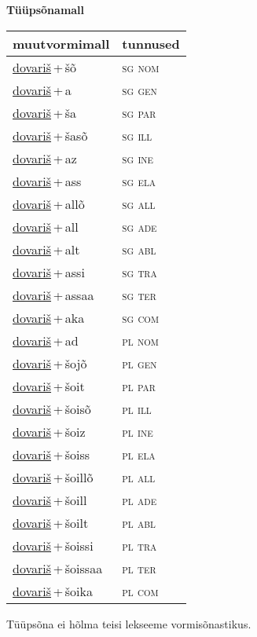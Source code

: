 
\vspace{1.8em}
\begin{minipage}{\textwidth}
\textbf{Tüüpsõnamall \,}\\

\begin{sideways}
\begin{tabular}{l l}
muutvormimall & tunnused \\
\hline
\underline{dovariš}\,+\,šõ & \textsc{ sg nom } \\
\underline{dovariš}\,+\,a & \textsc{ sg gen } \\
\underline{dovariš}\,+\,ša & \textsc{ sg par } \\
\underline{dovariš}\,+\,šasõ & \textsc{ sg ill } \\
\underline{dovariš}\,+\,az & \textsc{ sg ine } \\
\underline{dovariš}\,+\,ass & \textsc{ sg ela } \\
\underline{dovariš}\,+\,allõ & \textsc{ sg all } \\
\underline{dovariš}\,+\,all & \textsc{ sg ade } \\
\underline{dovariš}\,+\,alt & \textsc{ sg abl } \\
\underline{dovariš}\,+\,assi & \textsc{ sg tra } \\
\underline{dovariš}\,+\,assaa & \textsc{ sg ter } \\
\underline{dovariš}\,+\,aka & \textsc{ sg com } \\
\underline{dovariš}\,+\,ad & \textsc{ pl nom } \\
\underline{dovariš}\,+\,šojõ & \textsc{ pl gen } \\
\underline{dovariš}\,+\,šoit & \textsc{ pl par } \\
\underline{dovariš}\,+\,šoisõ & \textsc{ pl ill } \\
\underline{dovariš}\,+\,šoiz & \textsc{ pl ine } \\
\underline{dovariš}\,+\,šoiss & \textsc{ pl ela } \\
\underline{dovariš}\,+\,šoillõ & \textsc{ pl all } \\
\underline{dovariš}\,+\,šoill & \textsc{ pl ade } \\
\underline{dovariš}\,+\,šoilt & \textsc{ pl abl } \\
\underline{dovariš}\,+\,šoissi & \textsc{ pl tra } \\
\underline{dovariš}\,+\,šoissaa & \textsc{ pl ter } \\
\underline{dovariš}\,+\,šoika & \textsc{ pl com } \\
\end{tabular}
\end{sideways}
\label{tab:tüüpsõnamall-dovariššõ}

\end{minipage}

 
\vspace{1em}
\noindent Tüüpsõna ei hõlma teisi lekseeme vormi\-sõnastikus.
